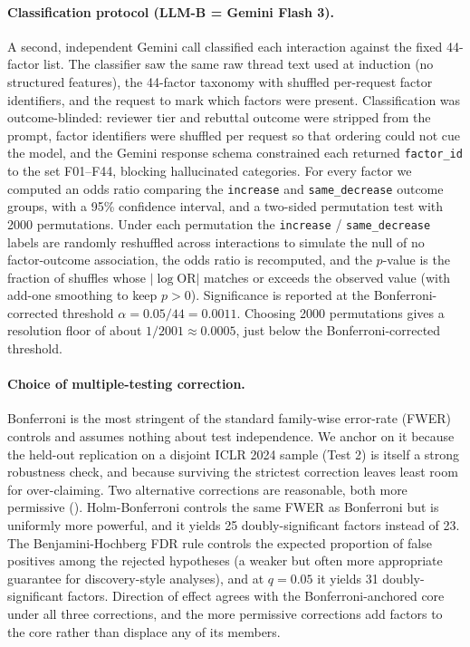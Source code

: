 \documentclass{article}
\newcommand{\code}[1]{\texttt{#1}}
\begin{document}
\paragraph{Classification protocol (LLM-B = Gemini Flash 3).}
A second, independent Gemini call classified each interaction against the fixed 44-factor list. The classifier saw the same raw thread text used at induction (no structured features), the 44-factor taxonomy with shuffled per-request factor identifiers, and the request to mark which factors were present. Classification was outcome-blinded: reviewer tier and rebuttal outcome were stripped from the prompt, factor identifiers were shuffled per request so that ordering could not cue the model, and the Gemini response schema constrained each returned \code{factor\_id} to the set F01--F44, blocking hallucinated categories. For every factor we computed an odds ratio comparing the \code{increase} and \code{same\_decrease} outcome groups, with a 95\% confidence interval, and a two-sided permutation test with 2000 permutations. Under each permutation the \code{increase} / \code{same\_decrease} labels are randomly reshuffled across interactions to simulate the null of no factor-outcome association, the odds ratio is recomputed, and the $p$-value is the fraction of shuffles whose $|\log \text{OR}|$ matches or exceeds the observed value (with add-one smoothing to keep $p > 0$). Significance is reported at the Bonferroni-corrected threshold $\alpha = 0.05 / 44 = 0.0011$. Choosing 2000 permutations gives a resolution floor of about $1/2001 \approx 0.0005$, just below the Bonferroni-corrected threshold.

\paragraph{Choice of multiple-testing correction.}
Bonferroni is the most stringent of the standard family-wise error-rate (FWER) controls and assumes nothing about test independence. We anchor on it because the held-out replication on a disjoint ICLR 2024 sample (Test 2) is itself a strong robustness check, and because surviving the strictest correction leaves least room for over-claiming. Two alternative corrections are reasonable, both more permissive (). Holm-Bonferroni controls the same FWER as Bonferroni but is uniformly more powerful, and it yields 25 doubly-significant factors instead of 23. The Benjamini-Hochberg FDR rule controls the expected proportion of false positives among the rejected hypotheses (a weaker but often more appropriate guarantee for discovery-style analyses), and at $q = 0.05$ it yields 31 doubly-significant factors. Direction of effect agrees with the Bonferroni-anchored core under all three corrections, and the more permissive corrections add factors to the core rather than displace any of its members.
\end{document}
